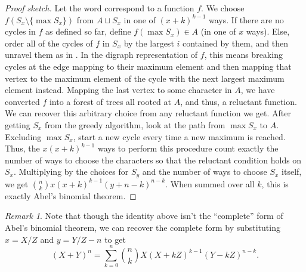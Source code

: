\documentclass[12 pt]{amsart}
\theoremstyle{definition} %
\theoremstyle{remark} %
\newtheorem{remark}[theorem]{Remark}
\begin{document}
\begin{proof}[Proof sketch]
	Let the word correspond to a function $f$. We choose $f(S_{x} \setminus \{ \max S_{x} \})$ from  $A \sqcup S_{x}$ in one of $(x + k)^{k - 1}$ ways. If there are no cycles in $f$ as defined so far, define $f(\max S_{x}) \in A$ (in one of $x$ ways). Else, order all of the cycles of $f$ in $S_{x}$ by the largest $i$ contained by them, and then unravel them as in \cite{shapiro-1991}. In the digraph representation of $f$, this means breaking cycles at the edge mapping to their maximum element and then mapping that vertex to the maximum element of the cycle with the next largest maximum element instead. Mapping the last vertex to some character in $A$, we have converted $f$ into a forest of trees all rooted at $A$, and thus, a reluctant function. We can recover this arbitrary choice from any reluctant function we get. After getting $S_{x}$ from the greedy algorithm, look at the path from $\max S_{x}$ to $A$. Excluding $\max S_{x}$, start a new cycle every time a new maximum is reached. Thus, the $x(x + k)^{k - 1}$ ways to perform this procedure count exactly the number of ways to choose the characters so that the reluctant condition holds on $S_{x}$. Multiplying by the choices for $S_{y}$ and the number of ways to choose $S_{x}$ itself, we get $\binom{n}{k} x (x + k)^{k - 1} (y + n - k)^{n - k}$. When summed over all $k$, this is exactly Abel's binomial theorem.
\end{proof}

\begin{remark}
	Note that though the identity above isn't the ``complete'' form of Abel's binomial theorem, we can recover the complete form by substituting $x = X/Z$ and $y = Y/Z - n$ to get
	\[
		(X + Y)^{n} = \sum_{k = 0}^{n} \binom{n}{k} X(X + kZ)^{k - 1} (Y - kZ)^{n - k}.
	\]
\end{remark}



\end{document}
